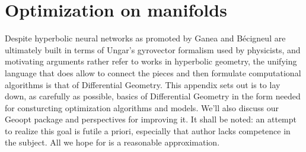 \chapter{Optimization on manifolds}


Despite hyperbolic neural networks as promoted by Ganea and B\'ecigneul are
ultimately built in terms of Ungar's gyrovector formalism used by physicists,
and motivating arguments rather refer  to works in hyperbolic geometry, the
unifying language that does allow to connect the pieces and then formulate
computational algorithms is that of Differential Geometry. This appendix sets
out is to lay down, as carefully as possible, basics of Differential Geometry
in the form needed for consturcting optimization algorithms and models.  We'll
also discuss our Geoopt package and perspectives for improving it.  It shall be
noted: an attempt to realize this goal is futile a priori, especially that
author lacks competence in the subject. All we hope for is a reasonable
approximation.
